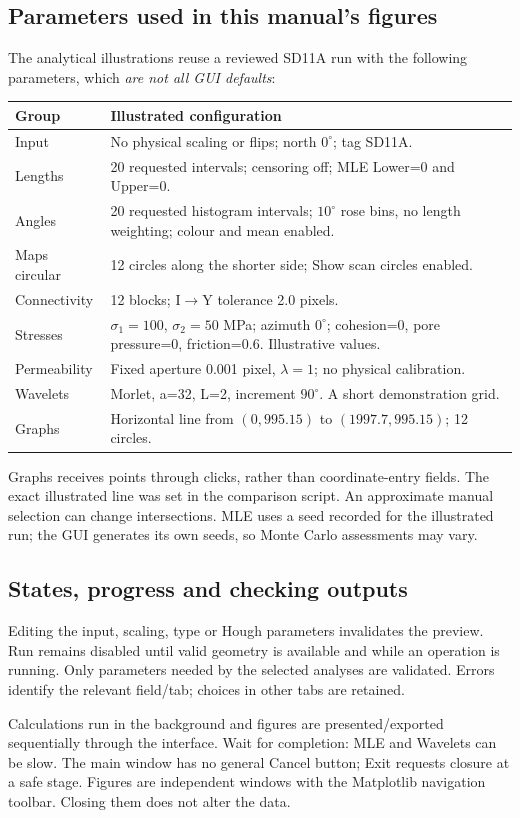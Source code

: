 \subsection{Parameters used in this manual's figures}\label{sec:parametros}
The analytical illustrations reuse a reviewed SD11A run with the following parameters, which \emph{are not all GUI defaults}:
\begin{longtable}{@{}p{.43\linewidth}p{.49\linewidth}@{}}
\toprule Group & Illustrated configuration\\\midrule\endhead
Input & No physical scaling or flips; north \(0^\circ\); tag SD11A.\\
Lengths & 20 requested intervals; censoring off; MLE Lower=0 and Upper=0.\\
Angles & 20 requested histogram intervals; \(10^\circ\) rose bins, no length weighting; colour and mean enabled.\\
Maps circular & 12 circles along the shorter side; Show scan circles enabled.\\
Connectivity & 12 blocks; I\(\to\)Y tolerance 2.0 pixels.\\
Stresses & \(\sigma_1=100\), \(\sigma_2=50\) MPa; azimuth \(0^\circ\); cohesion=0, pore pressure=0, friction=0.6. Illustrative values.\\
Permeability & Fixed aperture 0.001 pixel, \(\lambda=1\); no physical calibration.\\
Wavelets & Morlet, a=32, L=2, increment \(90^\circ\). A short demonstration grid.\\
Graphs & Horizontal line from \((0,995.15)\) to \((1997.7,995.15)\); 12 circles.\\\bottomrule
\end{longtable}
Graphs receives points through clicks, rather than coordinate-entry fields. The exact illustrated line was set in the comparison script. An approximate manual selection can change intersections. MLE uses a seed recorded for the illustrated run; the GUI generates its own seeds, so Monte Carlo assessments may vary.

\subsection{States, progress and checking outputs}
Editing the input, scaling, type or Hough parameters invalidates the preview. Run remains disabled until valid geometry is available and while an operation is running. Only parameters needed by the selected analyses are validated. Errors identify the relevant field/tab; choices in other tabs are retained.

Calculations run in the background and figures are presented/exported sequentially through the interface. Wait for completion: MLE and Wavelets can be slow. The main window has no general Cancel button; Exit requests closure at a safe stage. Figures are independent windows with the Matplotlib navigation toolbar. Closing them does not alter the data.

